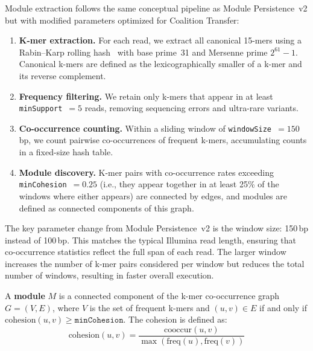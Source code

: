 \documentclass{../yalumba}
\begin{document}
Module extraction follows the same conceptual pipeline as Module
Persistence~v2 but with modified parameters optimized for Coalition Transfer:

\begin{enumerate}
  \item \textbf{K-mer extraction.}  For each read, we extract all canonical
        15-mers using a Rabin--Karp rolling hash~\cite{karp1987rabin} with
        base prime~31 and Mersenne prime $2^{61}-1$.  Canonical k-mers are
        defined as the lexicographically smaller of a k-mer and its reverse
        complement.
  \item \textbf{Frequency filtering.}  We retain only k-mers that appear in
        at least \texttt{minSupport}~$= 5$ reads, removing sequencing errors
        and ultra-rare variants.
  \item \textbf{Co-occurrence counting.}  Within a sliding window of
        \texttt{windowSize}~$= 150$\,bp, we count pairwise co-occurrences of
        frequent k-mers, accumulating counts in a fixed-size hash table.
  \item \textbf{Module discovery.}  K-mer pairs with co-occurrence rates
        exceeding \texttt{minCohesion}~$= 0.25$ (i.e., they appear together in
        at least 25\% of the windows where either appears) are connected by
        edges, and modules are defined as connected components of this graph.
\end{enumerate}


The key parameter change from Module Persistence~v2 is the window size:
150\,bp instead of 100\,bp.  This matches the typical Illumina read length,
ensuring that co-occurrence statistics reflect the full span of each read.
The larger window increases the number of k-mer pairs considered per window
but reduces the total number of windows, resulting in faster overall execution.

\begin{definition}
A \textbf{module} $M$ is a connected component of the k-mer co-occurrence
graph $G = (V, E)$, where $V$ is the set of frequent k-mers and
$(u, v) \in E$ if and only if
$\mathrm{cohesion}(u, v) \geq \texttt{minCohesion}$.
The cohesion is defined as:
\begin{equation}
  \mathrm{cohesion}(u, v) = \frac{\mathrm{cooccur}(u, v)}{\max(\mathrm{freq}(u), \mathrm{freq}(v))}
  \label{eq:cohesion}
\end{equation}
\end{definition}
\end{document}
